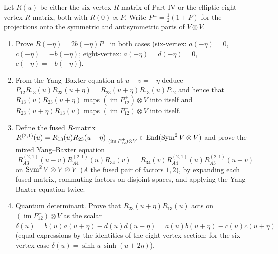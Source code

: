 \begin{exercise}[The fusion procedure: degeneration of $R$ at $u=-\eta$ and the fused $R$-matrix on $V_2\otimes V_1$]
Let $R(u)$ be either the six-vertex $R$-matrix of Part IV or the elliptic
eight-vertex $R$-matrix, both with $R(0)\propto P$.  Write
$P^{\pm}=\frac12(1\pm P)$ for the projections onto the symmetric and
antisymmetric parts of $V\otimes V$.
\begin{enumerate}[label=(\alph*)]
\item Prove $R(-\eta)=2b(-\eta)P^-$ in both cases (six-vertex:
$a(-\eta)=0$, $c(-\eta)=-b(-\eta)$; eight-vertex: $a(-\eta)=d(-\eta)=0$,
$c(-\eta)=-b(-\eta)$).
\item From the Yang--Baxter equation at $u-v=-\eta$ deduce
$P^-_{12}R_{13}(u)R_{23}(u+\eta)=R_{23}(u+\eta)R_{13}(u)P^-_{12}$ and hence
that $R_{13}(u)R_{23}(u+\eta)$ maps $(\operatorname{im}P^+_{12})\otimes V$
into itself and $R_{23}(u+\eta)R_{13}(u)$ maps $(\operatorname{im}P^-_{12})\otimes V$
into itself.
\item Define the fused $R$-matrix
$R^{(2,1)}(u)=R_{13}(u)R_{23}(u+\eta)\big|_{(\operatorname{im}P^+_{12})\otimes V}\in\operatorname{End}(\operatorname{Sym}^2V\otimes V)$
and prove the mixed Yang--Baxter equation
\[
 R^{(2,1)}_{A3}(u-v)R^{(2,1)}_{A4}(u)R_{34}(v)=R_{34}(v)R^{(2,1)}_{A4}(u)R^{(2,1)}_{A3}(u-v)
\]
on $\operatorname{Sym}^2V\otimes V\otimes V$ ($A$ the fused pair of factors $1,2$), by
expanding each fused matrix, commuting factors on disjoint spaces, and
applying the Yang--Baxter equation twice.
\item Quantum determinant.  Prove that $R_{23}(u+\eta)R_{13}(u)$ acts on
$(\operatorname{im}P^-_{12})\otimes V$ as the scalar
$\delta(u)=b(u)a(u+\eta)-d(u)d(u+\eta)=a(u)b(u+\eta)-c(u)c(u+\eta)$
(equal expressions by the identities of the eight-vertex section; for the
six-vertex case $\delta(u)=\sinh u\,\sinh(u+2\eta)$).
\end{enumerate}
\end{exercise}

